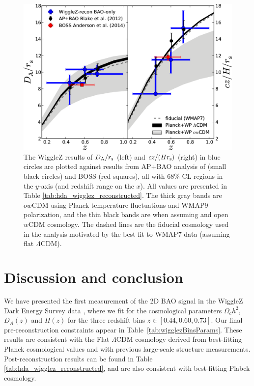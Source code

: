 \documentclass[iop,twocolappendix]{emulateapj}
\begin{document}
\begin{figure}
\begin{center}
\includegraphics[width=\columnwidth]{figures/hubble_HDa/hubble_HDa}
\caption{\label{fig:hubble_diagram} The WiggleZ results of $D_{\rm A}/r_{\rm s}$ (left) and $cz/(Hr_{\rm s})$ (right) in blue circles are plotted against results from AP+BAO analysis of \cite{BlakeBroughColless2012} (small black circles) and BOSS \cite{AndersonAubourg2014} (red squares), all with 68$\%$ CL regions in the $y$-axis (and redshift range on the $x$). All values are presented in Table \ref{tab:hda_wigglez_reconstructed}. The thick gray bands are $ow$CDM using Planck temperature fluctuations and WMAP9 polarization, and the thin black bands are when assuming and open $w$CDM cosmology. The dashed lines are the fiducial cosmology used in the analysis motivated by the best fit to WMAP7 data (assuming flat $\Lambda$CDM).}
\end{center}
\end{figure}










\section{Discussion and conclusion}

\label{sec:disc}
\label{sec:conclusion}



We have presented the first measurement of the 2D BAO signal in the WiggleZ Dark Energy Survey data \citep{KazinKoda2014}, where we fit for the cosmological parameters $\Omega_c h^2$, $D_A(z)$ and $H(z)$ for the three redshift bins $z \in \left[0.44, 0.60, 0.73\right]$.  Our final pre-reconstruction constraints appear in Table~\ref{tab:wigglezBinsParams}.  These results are consistent with the Flat $\Lambda$CDM cosmology derived from best-fitting Planck cosmological values and with previous large-scale structure measurements. Post-reconstruction results can be found in Table \ref{tab:hda_wigglez_reconstructed}, and are also consistent with best-fitting Plabck cosmology.
\end{document}
